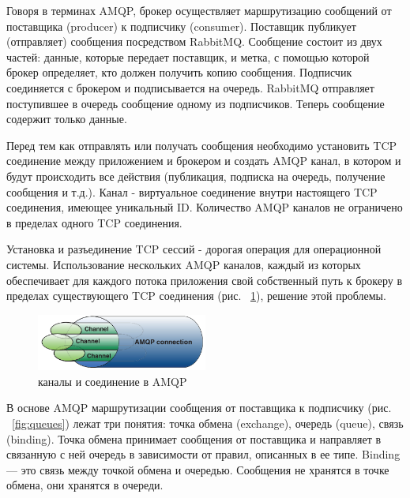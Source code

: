 Говоря в терминах AMQP, брокер осуществляет маршрутизацию сообщений от поставщика (producer) к подписчику (consumer). Поставщик публикует (отправляет) сообщения посредством RabbitMQ. Сообщение состоит из двух частей: данные, которые передает поставщик, и метка, с помощью которой брокер определяет, кто должен получить копию сообщения. Подписчик соединяется с брокером и подписывается на очередь. RabbitMQ отправляет поступившее в очередь сообщение одному из подписчиков. Теперь сообщение содержит только данные.

Перед тем как отправлять или получать сообщения необходимо установить TCP соединение между приложением и брокером и создать AMQP канал, в котором и будут происходить все действия (публикация, подписка на очередь, получение сообщения и т.д.). Канал - виртуальное соединение внутри настоящего TCP соединения, имеющее уникальный ID. Количество AMQP каналов не ограничено в пределах одного TCP соединения.

Установка и разъединение TCP сессий - дорогая операция для операционной системы. Использование нескольких AMQP каналов, каждый из которых обеспечивает  для каждого потока приложения свой собственный путь к брокеру в пределах существующего TCP соединения (рис. ~\ref{fig:channel}), решение этой проблемы.
\begin{figure}
\centering
\includegraphics[width=0.5\textwidth]{img/channels.png}
\caption{каналы и соединение в AMQP}
\label{fig:channel}
\end{figure}
В основе AMQP маршрутизации сообщения от поставщика к подписчику (рис. ~\ref{fig:queues}) лежат три понятия: точка обмена (exchange), очередь (queue), связь (binding). Точка обмена принимает сообщения от поставщика и направляет в связанную с ней очередь в зависимости от правил, описанных в ее типе. Binding --- это связь между точкой обмена и очередью. Сообщения не хранятся в точке обмена, они хранятся в очереди.

